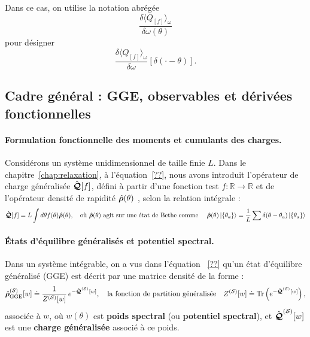 Dans ce cas, on utilise la notation abrégée
\[
\frac{\delta \langle Q_{[f]} \rangle_{\omega} }{\delta \omega(\theta)}
\]
pour désigner
\[
\frac{\delta \langle Q_{[f]} \rangle_{\omega} }{\delta \omega}[\delta(\cdot - \theta)].
\]


\subsection{Cadre général : GGE, observables et dérivées fonctionnelles}


\paragraph{Formulation fonctionnelle des moments et cumulants des charges.}
Considérons un système unidimensionnel de taille finie $L$. 
Dans le chapitre~\ref{chap:relaxation}, à l’équation~\eqref{??}, nous avons introduit l’opérateur de charge généralisée $\hat{\bm{\mathcal{Q}}}[f]$, défini à partir d'une fonction test $f \colon \mathbb{R} \to \mathbb{R}$ et de l'opérateur densité de rapidité  $\hat{\bm{\rho}}(\theta)$ , selon la relation intégrale :
\begin{eqnarray}\label{chap4:eq.charge.q.1}
	\hat{\bm{\mathcal{Q}}}[f] = L\int d\theta f(\theta) \hat{\bm{\rho}}(\theta),\quad \text{où $\hat{\bm{\rho}}(\theta)$ agit sur une état de Bethe comme } \quad \hat{\bm{\rho}}(\theta) \ket{ \{ \theta_a \} } = \frac{1}{L} \sum \delta ( \theta - \theta_a ) \ket{ \{ \theta_a \} }
\end{eqnarray}

\paragraph{États d'équilibre généralisés et potentiel spectral.}
Dans un système intégrable, on a vus dans l'équation ~\eqref{??} qu'un état d’équilibre généralisé (GGE) est décrit par une matrice densité de la forme :
\begin{eqnarray}
	\hat{\bm{\rho}}_{\mathrm{GGE}}^{(\mathcal{S})}[w] \doteq  \frac{1}{Z^{(\mathcal{S})}[w]}\, e^{-\hat{\bm{\mathcal{Q}}}^{(\mathcal{S})}[w]},\quad \text{la fonction de partition généralisée} \quad Z^{(\mathcal{S})}[w] \doteq \mathrm{Tr}\left(e^{-\hat{\bm{\mathcal{Q}}}^{(\mathcal{S})}[w]}\right),
\end{eqnarray}
associée à $w$, où \( w(\theta) \) est {\bf poids spectral} (ou {\bf potentiel spectral}), et   \( \hat{\bm{\mathcal{Q}}}^{(\mathcal{S})}[w] \) est une {\bf charge généralisée} associé à ce poids.\\

